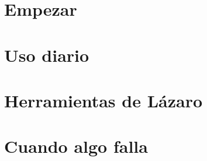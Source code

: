 \documentclass[12pt,a4paper,openany]{book}
\begin{document}
\frontmatter

\tableofcontents


\mainmatter
\part{Empezar}






\part{Uso diario}










\part{Herramientas de Lázaro}


\part{Cuando algo falla}




\appendix




\backmatter
\printbibliography[heading=bibintoc,title={Bibliografía}]
\end{document}
